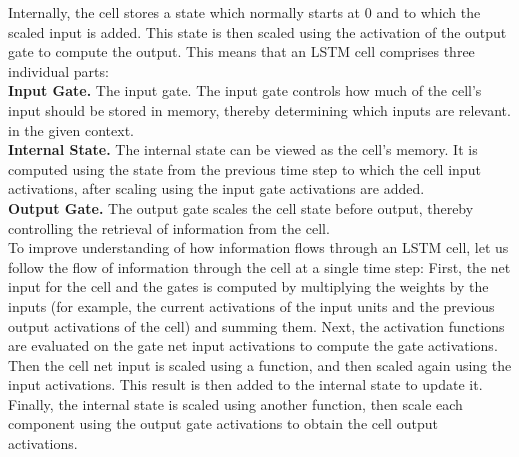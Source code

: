 \documentclass[twoside,a4paper,10pt,DIV=12,BCOR=12mm]{scrartcl}
\begin{document}
Internally, the cell stores a state which normally starts at \begin{math}0\end{math} and to which the scaled input is added. This state is then scaled using the activation of the output gate to compute the output.
This means that an LSTM cell comprises three individual parts:\\
\textbf{Input Gate.} The input gate. The input gate controls how much of the cell's input should be stored in memory, thereby determining which inputs are relevant. in the given context.\\
\textbf{Internal State.} The internal state can be viewed as the cell's memory. It is computed using the state from the previous time step to which the cell input activations, after scaling using the input gate activations are added.\\
\textbf{Output Gate.} The output gate scales the cell state before output, thereby controlling the retrieval of information from the cell.\cite{hochreiter1997lstm} \\
To improve understanding of how information flows through an LSTM cell, let us follow the flow of information through the cell at a single time step:
First, the net input for the cell and the gates is computed by multiplying the weights by the inputs (for example, the current activations of the input units and the previous output activations of the cell) and summing them. Next, the activation functions are evaluated on the gate net input activations to compute the gate activations. Then the cell net input is scaled using a function, and then scaled again using the input activations. This result is then added to the internal state to update it. Finally,  the internal state is scaled using another function, then scale each component using the output gate activations to obtain the cell output activations.\cite{hochreiter1997lstm}
\end{document}
